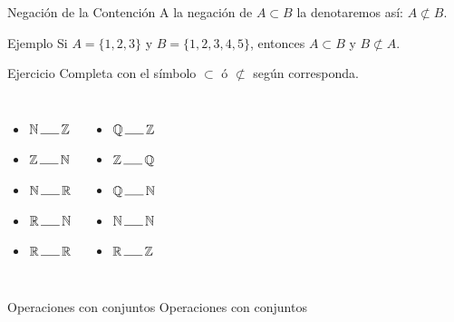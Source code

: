 \documentclass[aspectratio=169]{beamer}
\begin{document}
\begin{frame}[t]{Negación de la Contención}
    A la negación de $A \subset B$ la denotaremos así: $A \not\subset B$.
    \begin{block}{Ejemplo}
    Si $A = \{ 1, 2, 3\}$ y $B = \{ 1, 2, 3, 4, 5 \}$, entonces $A \subset B$ y $B\not\subset  A$.
\end{block}
\begin{block}{Ejercicio}
Completa con el símbolo $ \subset$ ó $\not\subset$ según corresponda.
\begin{columns}[onlytextwidth]
\begin{itemize}
    \item $\mathbb{N}\,\line(1,0){15}\,  \mathbb{Z}$
    \item $\mathbb{Z}\,\line(1,0){15}\,  \mathbb{N}$
    \item $\mathbb{N}\,\line(1,0){15}\,  \mathbb{R}$
    \item $\mathbb{R}\,\line(1,0){15}\,  \mathbb{N}$
    \item $\mathbb{R}\,\line(1,0){15}\,  \mathbb{R}$
\end{itemize}



\begin{itemize}
    \item $\mathbb{Q}\,\line(1,0){15}\,  \mathbb{Z}$
    \item $\mathbb{Z}\,\line(1,0){15}\,  \mathbb{Q}$
    \item $\mathbb{Q}\,\line(1,0){15}\,  \mathbb{N}$
    \item $\mathbb{N}\,\line(1,0){15}\,  \mathbb{N}$
    \item $\mathbb{R}\,\line(1,0){15}\,  \mathbb{Z}$
\end{itemize}
\end{columns}
\end{block}
\end{frame}


\begin{frame}[t]{Operaciones con conjuntos}\vspace{30pt}
\Huge
Operaciones con conjuntos
\end{frame}
\end{document}
